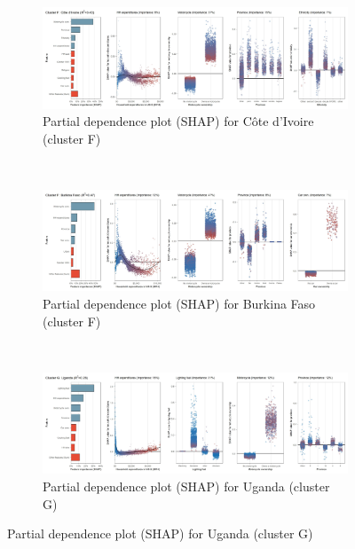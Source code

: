 \begin{figure}[ht!]\ContinuedFloat
    \centering
   \begin{subfigure}[b]{\textwidth}
         \centering
         \caption{Partial dependence plot (SHAP) for Côte d'Ivoire (cluster F)}
         \label{fig:5b_CIV}
         \includegraphics[width=\textwidth]{Figure 5b/Figure_5b_CIV}         
     \end{subfigure}
    \\
    \vspace{0.5cm}
   \begin{subfigure}[b]{\textwidth}
         \centering
         \caption{Partial dependence plot (SHAP) for Burkina Faso (cluster F)}
         \label{fig:5b_BFA}
         \includegraphics[width=\textwidth]{Figure 5b/Figure_5b_BFA}         
     \end{subfigure}
    \\
    \vspace{0.5cm}
   \begin{subfigure}[b]{\textwidth}
         \centering
         \caption{Partial dependence plot (SHAP) for Uganda (cluster G)}
         \label{fig:5b_UGA}
         \includegraphics[width=\textwidth]{Figure 5b/Figure_5b_UGA}

\end{subfigure}
\end{figure}
